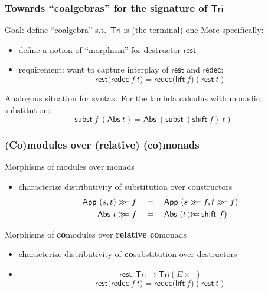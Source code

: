 \documentclass[
]
{beamer}
\newcommand{\constfont}[1]{\ensuremath{\mathsf{#1}}}
\newcommand{\bind}[2]{{#1}\mathbin{\gg\hspace{-.8ex}=}{#2}}
\newcommand{\Tri}{\constfont{Tri}}
\newcommand{\tail}{\constfont{rest}}
\newcommand{\redec}{\constfont{redec}}
\newcommand{\shift}{\constfont{shift}}
\newcommand{\lift}{\constfont{lift}}
\newcommand{\subst}{\constfont{subst}}
\newcommand{\App}{\constfont{App}}
\newcommand{\Abs}{\constfont{Abs}}
\newcommand{\fat}[1]{\textbf{#1}}
\begin{document}
\begin{frame}
 \frametitle{Towards \enquote{coalgebras} for the signature of $\Tri$}
 
  \begin{block}{Goal: define \enquote{coalgebra} s.t.\ $\Tri$ is (the terminal) one}
    More specifically:
    \begin{itemize}
     \item define a notion of \enquote{morphism} for destructor $\tail$
     \item requirement: want to capture interplay of $\tail$ and $\redec$:
       \[\tail\bigl(\redec~f~t\bigr) = \redec\bigl(\lift~f\bigr)(\tail~t)\]
    \end{itemize}
  \end{block}

 \begin{block}{Analogous situation for syntax:}
   For the lambda calculus with monadic substitution:
      \[ \subst~f~(\Abs~t) = \Abs~(\subst~(\shift~f)~t) \]
 \end{block}

 
\end{frame}


\begin{frame}
 \frametitle{(Co)modules over (relative) (co)monads}
 \begin{block}{Morphisms of modules over monads}
  \begin{itemize}
   \item characterize distributivity of substitution over constructors
      \begin{align*} \bind{\App~(s,t)}{f} \quad &= \quad \App~(\bind{s}{f},\bind{t}{f}) \\
                     \bind{\Abs~t}{f}       \quad &= \quad \Abs~(\bind{t}{\shift~f})
      \end{align*}
  \end{itemize}
 \end{block}

 \begin{block}{Morphisms of \fat{co}modules over \fat{relative co}monads}
  \begin{itemize}
   \item characterize distributivity of \fat{co}substitution over destructors
   \item %
         \[\tail : \Tri \to \Tri(E\times \_)\]
             \[\tail\bigl(\redec~f~t\bigr) = \redec\bigl(\lift~f\bigr)(\tail~t) \]
  \end{itemize}
 \end{block} 
\end{frame}
\end{document}
